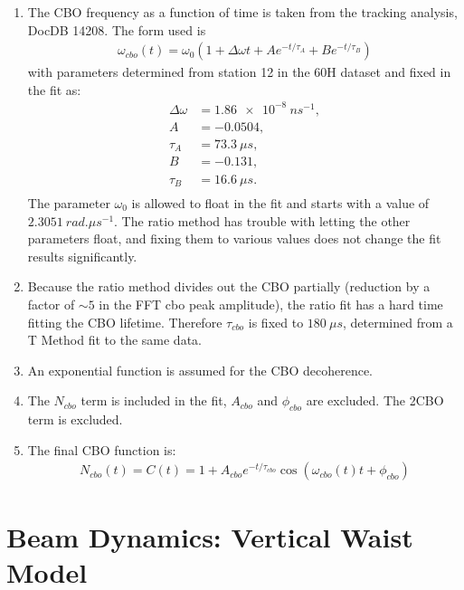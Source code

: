 \begin{enumerate}
	\item{The CBO frequency as a function of time is taken from the tracking analysis, DocDB 14208. The form used is 
		\begin{gather*}
			\omega_{cbo}(t) = \omega_{0}(1 + \Delta\omega t + A e^{-t/\tau_{A}} + B e^{-t/\tau_{B}})
		\end{gather*}
	with parameters determined from station 12 in the 60H dataset and fixed in the fit as:
		\begin{equation*}	
		\begin{aligned}
		 	\Delta\omega &= \SI{1.86e-8}{ns^{-1}}, \\
		 	A &= -0.0504, \\
		 	\tau_{A} &= \SI{73.3}{\mu s}, \\
		 	B &= -0.131, \\
		 	\tau_{B} &= \SI{16.6}{\mu s}. \\
		\end{aligned}
		\end{equation*}
	The parameter $\omega_{0}$ is allowed to float in the fit and starts with a value of $\SI{2.3051}{rad.\mu s^{-1}}$. The ratio method has trouble with letting the other parameters float, and fixing them to various values does not change the fit results significantly.}
	\item{Because the ratio method divides out the CBO partially (reduction by a factor of $\sim5$ in the FFT cbo peak amplitude), the ratio fit has a hard time fitting the CBO lifetime. Therefore $\tau_{cbo}$ is fixed to $\SI{180}{\mu s}$, determined from a T Method fit to the same data.}
	\item{An exponential function is assumed for the CBO decoherence.}
	\item{The $N_{cbo}$ term is included in the fit, $A_{cbo}$ and $\phi_{cbo}$ are excluded. The 2CBO term is excluded.}
	\item{The final CBO function is:
		\begin{gather*}
				N_{cbo}(t) = C(t) = 1 + A_{cbo} e^{-t/\tau_{cbo}} \cos(\omega_{cbo}(t)t + \phi_{cbo})
		\end{gather*}
	}
\end{enumerate}


\section{Beam Dynamics: Vertical Waist Model}

